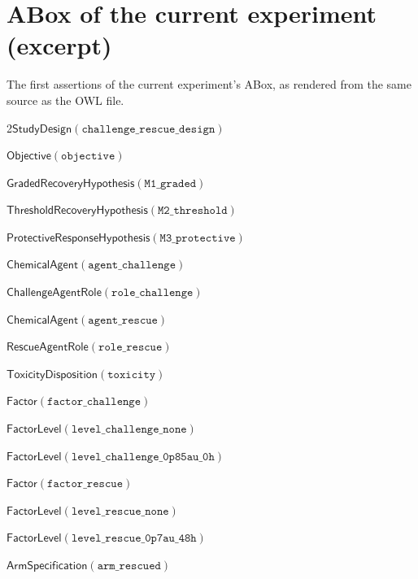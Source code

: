 \documentclass[10pt,a4paper]{article}
\begin{document}
\section{ABox of the current experiment (excerpt)}\label{app:abox}
The first assertions of the current experiment's ABox, as rendered from the same source as the OWL file.
{\scriptsize\begin{multicols}{2}$\mathsf{StudyDesign}(\mathtt{challenge\_\allowbreak{}\allowbreak{}rescue\_\allowbreak{}\allowbreak{}design})$\par
$\mathsf{Objective}(\mathtt{objective})$\par
$\mathsf{GradedRecoveryHypothesis}(\mathtt{M1\_\allowbreak{}\allowbreak{}graded})$\par
$\mathsf{ThresholdRecoveryHypothesis}(\mathtt{M2\_\allowbreak{}\allowbreak{}threshold})$\par
$\mathsf{ProtectiveResponseHypothesis}(\mathtt{M3\_\allowbreak{}\allowbreak{}protective})$\par
$\mathsf{ChemicalAgent}(\mathtt{agent\_\allowbreak{}\allowbreak{}challenge})$\par
$\mathsf{ChallengeAgentRole}(\mathtt{role\_\allowbreak{}\allowbreak{}challenge})$\par
$\mathsf{ChemicalAgent}(\mathtt{agent\_\allowbreak{}\allowbreak{}rescue})$\par
$\mathsf{RescueAgentRole}(\mathtt{role\_\allowbreak{}\allowbreak{}rescue})$\par
$\mathsf{ToxicityDisposition}(\mathtt{toxicity})$\par
$\mathsf{Factor}(\mathtt{factor\_\allowbreak{}\allowbreak{}challenge})$\par
$\mathsf{FactorLevel}(\mathtt{level\_\allowbreak{}\allowbreak{}challenge\_\allowbreak{}\allowbreak{}none})$\par
$\mathsf{FactorLevel}(\mathtt{level\_\allowbreak{}\allowbreak{}challenge\_\allowbreak{}\allowbreak{}0p85au\_\allowbreak{}\allowbreak{}0h})$\par
$\mathsf{Factor}(\mathtt{factor\_\allowbreak{}\allowbreak{}rescue})$\par
$\mathsf{FactorLevel}(\mathtt{level\_\allowbreak{}\allowbreak{}rescue\_\allowbreak{}\allowbreak{}none})$\par
$\mathsf{FactorLevel}(\mathtt{level\_\allowbreak{}\allowbreak{}rescue\_\allowbreak{}\allowbreak{}0p7au\_\allowbreak{}\allowbreak{}48h})$\par
$\mathsf{ArmSpecification}(\mathtt{arm\_\allowbreak{}\allowbreak{}rescued})$\par

\end{multicols}}
\end{document}
